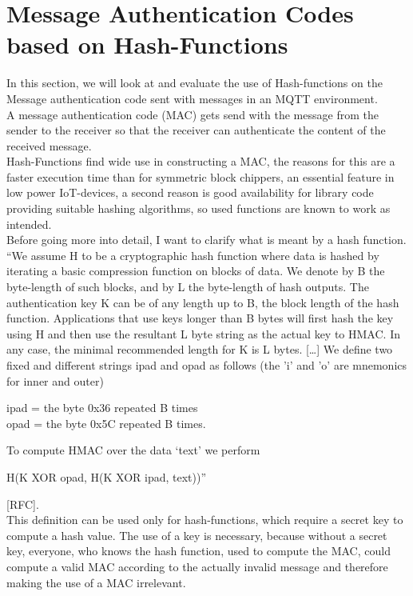 \section{Message Authentication Codes based on Hash-Functions}

In this section, we will look at and evaluate the use of Hash-functions on the Message authentication code sent with messages in an MQTT environment. \\
A message authentication code (MAC) gets send with the message from the sender to the receiver so that the receiver can authenticate the content of the received message. \\
Hash-Functions find wide use in constructing a MAC, the reasons for this are a faster execution time than for symmetric block chippers, an essential feature in low power IoT-devices, a second reason is good availability for library code providing suitable hashing algorithms, so used functions are known to work as intended. \\
Before going more into detail, I want to clarify what is meant by a hash function. “We assume H to be a cryptographic hash function where data is hashed by iterating a basic compression function on blocks of data. We denote by B the byte-length of such blocks, and by L the byte-length of hash outputs. The authentication key K can be of any length up to B, the block length of the hash function. Applications that use keys longer than B bytes will first hash the key using H and then use the resultant L byte string as the actual key to HMAC. In any case, the minimal recommended length for K is L bytes. […] We define two fixed and different strings ipad and opad as follows (the ’i’ and ’o’ are mnemonics for inner and outer)
\begin{center}
ipad = the byte 0x36 repeated B times \\
opad = the byte 0x5C repeated B times.
\end{center}
To compute HMAC over the data ‘text’ we perform 
\begin{center}
H(K XOR opad, H(K XOR ipad, text))”
\end{center}
[RFC].  \\
 This definition can be used only for hash-functions, which require a secret key to compute a hash value. The use of a key is necessary, because without a secret key, everyone, who knows the hash function, used to compute the MAC, could compute a valid MAC according to the actually invalid message and therefore making the use of a MAC irrelevant. \\
